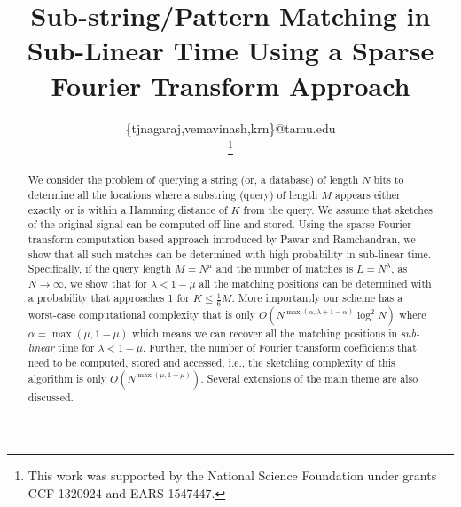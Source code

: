 \documentclass[journal,11pt,onecolumn]{IEEEtran}  %
\title{\LARGE \bf
Sub-string/Pattern Matching in Sub-Linear Time Using a Sparse Fourier Transform Approach
}
\author{\IEEEauthorblockN{Nagaraj T. Janakiraman, Avinash Vem, Krishna R. Narayanan \\}
\IEEEauthorblockA{Department of Electrical \& Comp. Engg., Texas A\&M University, College Station, TX, U.S.A\\}
\{tjnagaraj,vemavinash,krn\}@tamu.edu\\
\thanks{This work was supported by the National Science Foundation under grants CCF-1320924 and EARS-1547447.}
}
\begin{document}
\maketitle
\thispagestyle{empty}
\pagestyle{empty}

\begin{abstract}
We consider the problem of querying a string (or, a database) of length $N$ bits to determine all the locations where a substring (query) of length $M$ appears either exactly or is within a Hamming distance of $K$ from the query. We assume that sketches of the original signal can be computed off line and stored. Using the sparse Fourier transform computation based approach introduced by Pawar and Ramchandran, we show that all such matches can be determined with high probability in sub-linear time. Specifically, if the query length $M = N^\mu$ and the number of matches is $L=N^\lambda$, as $N \rightarrow \infty$, we show that  for $\lambda < 1-\mu$ all the matching positions can be determined with a probability that approaches 1 for $K \leq \frac{1}{6}M$. More importantly our scheme has a worst-case computational complexity that is only $O\left(N^{\max(\alpha,\lambda+1-\alpha)} \log^2 N \right)$ where $\alpha=\max(\mu,1-\mu)$ which means we can recover all the matching positions in {\it sub-linear} time for $\lambda<1-\mu$. Further, the number of Fourier transform coefficients that need to be computed, stored and accessed, i.e., the sketching complexity of this algorithm is only $O\left( N^{\max(\mu,1-\mu)}\right)$. Several extensions of the main theme are also discussed.
\end{abstract}








\end{document}
